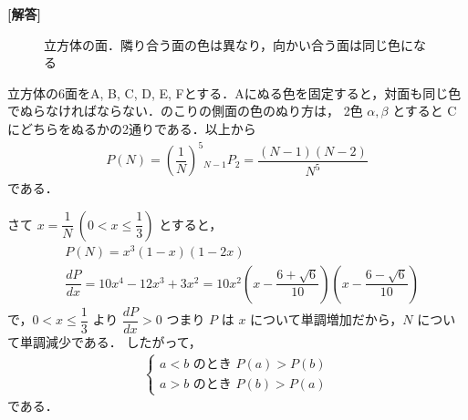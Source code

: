\documentclass[../../main.tex]{subfiles}
\begin{document}
\begin{oframed}
  
\end{oframed}

{\bf [解答]}

\begin{figure}[htbp]
  \centering
  \caption{立方体の面．隣り合う面の色は異なり，向かい合う面は同じ色になる}
\end{figure}

立方体の6面をA, B, C, D, E, Fとする．Aにぬる色を固定すると，対面も同じ色でぬらなければならない．のこりの側面の色のぬり方は，
2色 $\alpha, \beta$ とすると Cにどちらをぬるかの2通りである．以上から
\begin{align}
  P(N) = \left(\dfrac{1}{N}\right)^5 {}_{N-1}P_2 = \dfrac{(N-1)(N-2)}{N^5} \label{eq:1}
\end{align}
である．

さて $x = \dfrac{1}{N} \ (0 < x \le \dfrac{1}{3})$ とすると，
\begin{align}
  & P(N) = x^3(1-x)(1-2x) \\
  & \dfrac{dP}{dx} = 10x^4 - 12x^3 + 3x^2 = 10x^2 \left(x - \dfrac{6+\sqrt{6}}{10}\right)\left(x - \dfrac{6-\sqrt{6}}{10}\right)
\end{align}
で，$0 < x \le \dfrac{1}{3}$ より $\dfrac{dP}{dx} > 0$ つまり $P$ は $x$ について単調増加だから，$N$ について単調減少である．
したがって，
\begin{align}
  \begin{cases} a < b \text{ のとき } P(a) > P(b) \\ a > b \text{ のとき } P(b) > P(a)
  \end{cases}
\end{align}
である．
\end{document}
